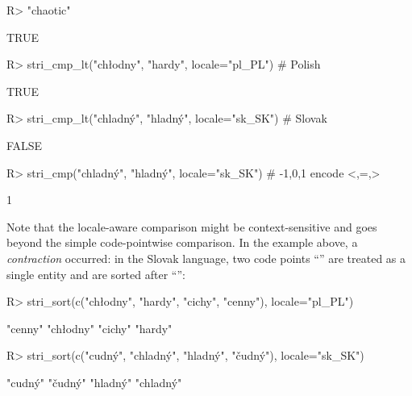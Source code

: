 \documentclass[nojss]{jss}
\begin{document}
\begin{Schunk}
\begin{Sinput}
R> "chaotic" %s<% "hard" # current default locale (here: en_AU)
\end{Sinput}
\begin{Soutput}
[1] TRUE
\end{Soutput}
\begin{Sinput}
R> stri_cmp_lt("chłodny", "hardy", locale="pl_PL")  # Polish
\end{Sinput}
\begin{Soutput}
[1] TRUE
\end{Soutput}
\begin{Sinput}
R> stri_cmp_lt("chladný", "hladný", locale="sk_SK") # Slovak
\end{Sinput}
\begin{Soutput}
[1] FALSE
\end{Soutput}
\begin{Sinput}
R> stri_cmp("chladný", "hladný", locale="sk_SK")    # -1,0,1 encode <,=,>
\end{Sinput}
\begin{Soutput}
[1] 1
\end{Soutput}
\end{Schunk}

Note that the locale-aware comparison might be context-sensitive
and goes beyond the simple code-pointwise comparison.
In the example above, a \textit{contraction} occurred: in the Slovak language,
two code points ``'' are treated as a single entity
and are sorted after ``'':

\begin{Schunk}
\begin{Sinput}
R> stri_sort(c("chłodny", "hardy", "cichy", "cenny"), locale="pl_PL")
\end{Sinput}
\begin{Soutput}
[1] "cenny"   "chłodny" "cichy"   "hardy"
\end{Soutput}
\begin{Sinput}
R> stri_sort(c("cudný", "chladný", "hladný", "čudný"), locale="sk_SK")
\end{Sinput}
\begin{Soutput}
[1] "cudný"   "čudný"   "hladný"  "chladný"
\end{Soutput}
\end{Schunk}

\end{document}
